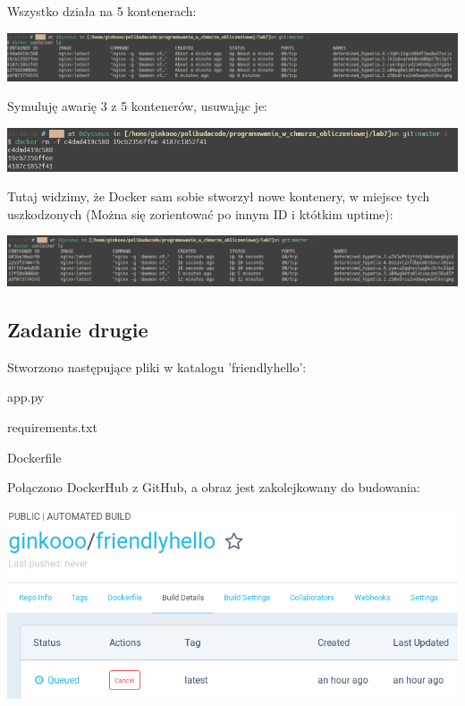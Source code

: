 \documentclass[12pt]{article}
\begin{document}
    Wszystko działa na 5 kontenerach:

    \includegraphics[width=\textwidth]{1_6.png}

    Symuluję awarię 3 z 5 kontenerów, usuwając je:

    \includegraphics[width=\textwidth]{1_7.png}

    Tutaj widzimy, że Docker sam sobie stworzył nowe kontenery, w miejsce tych uszkodzonych (Można się zorientować po innym ID i któtkim uptime):

    \includegraphics[width=\textwidth]{1_8.png}

    \subsection{Zadanie drugie}

    Stworzono następujące pliki w katalogu 'friendlyhello':

    app.py

    

    requirements.txt

    

    Dockerfile

    

    Połączono DockerHub z GitHub, a obraz jest zakolejkowany do budowania:

    \includegraphics[width=\textwidth]{2_1.png}
\end{document}

